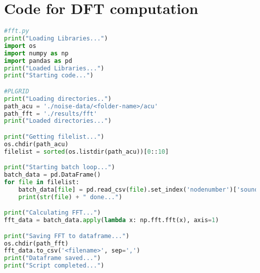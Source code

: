 \chapter{Code for DFT computation} %

\label{codefft} %


\begin{lstlisting}[language=Python]
#fft.py
print("Loading Libraries...")
import os
import numpy as np
import pandas as pd
print("Loaded Libraries...")
print("Starting code...")

#PLGRID
print("Loading directories..")
path_acu = './noise-data/<folder-name>/acu'
path_fft = './results/fft'
print("Loaded directories...")

print("Getting filelist...")
os.chdir(path_acu)
filelist = sorted(os.listdir(path_acu))[0::10]

print("Starting batch loop...")
batch_data = pd.DataFrame()
for file in filelist:
    batch_data[file] = pd.read_csv(file).set_index('nodenumber')['sound-pressure']
    print(str(file) + " done...")

print("Calculating FFT...")
fft_data = batch_data.apply(lambda x: np.fft.fft(x), axis=1)

print("Saving FFT to dataframe...")
os.chdir(path_fft)
fft_data.to_csv('<filename>', sep=',')
print("Dataframe saved...")
print("Script completed...")
\end{lstlisting}